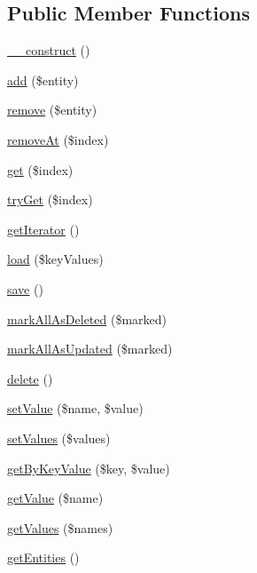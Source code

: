 \subsection*{Public Member Functions}
\begin{DoxyCompactItemize}
\item 
\hyperlink{classEntityList_ad54f70a37071343afd7cc87c01fa636e}{\_\-\_\-construct} ()
\item 
\hyperlink{classEntityList_a65960f27e39a393fb9554f725c333e12}{add} (\$entity)
\item 
\hyperlink{classEntityList_a5ec81b26c533af92dcf6af06e6b4e54e}{remove} (\$entity)
\item 
\hyperlink{classEntityList_afa9c310fb513d687dc753fe0f7e31431}{removeAt} (\$index)
\item 
\hyperlink{classEntityList_a74b902eba1e67bc6133c923a02540b37}{get} (\$index)
\item 
\hyperlink{classEntityList_a110854b1b33f521cb3c3f2f8de786177}{tryGet} (\$index)
\item 
\hyperlink{classEntityList_a2320391f82acdb29e4b68efd47081b62}{getIterator} ()
\item 
\hyperlink{classEntityList_ae5f55d5e1df620ba120b6ab4e6cec15d}{load} (\$keyValues)
\item 
\hyperlink{classEntityList_af2c7d6e2bfa78d6af8d7357dd49e5d4b}{save} ()
\item 
\hyperlink{classEntityList_a5b2c2e5947b0821fb90e036d7ae98fdb}{markAllAsDeleted} (\$marked)
\item 
\hyperlink{classEntityList_a302b1ec9c4be159736e937ee8ed6a33b}{markAllAsUpdated} (\$marked)
\item 
\hyperlink{classEntityList_a9c027ff7f947b077129e0f4bdaaa3c08}{delete} ()
\item 
\hyperlink{classEntityList_a66784d8f928108863442c7429932c247}{setValue} (\$name, \$value)
\item 
\hyperlink{classEntityList_a041e92de11dad274df94247c3c1537c4}{setValues} (\$values)
\item 
\hyperlink{classEntityList_a172772d052d7fc9407c1646a504c9a57}{getByKeyValue} (\$key, \$value)
\item 
\hyperlink{classEntityList_a740ab9d2b87a8641b47e29b80b99badc}{getValue} (\$name)
\item 
\hyperlink{classEntityList_ada2cd7ee35783d406d1d58c0814afd3e}{getValues} (\$names)
\item 
\hyperlink{classEntityList_a9d5a500eeea0e7e7014e65f06e6b15f7}{getEntities} ()
\end{DoxyCompactItemize}
